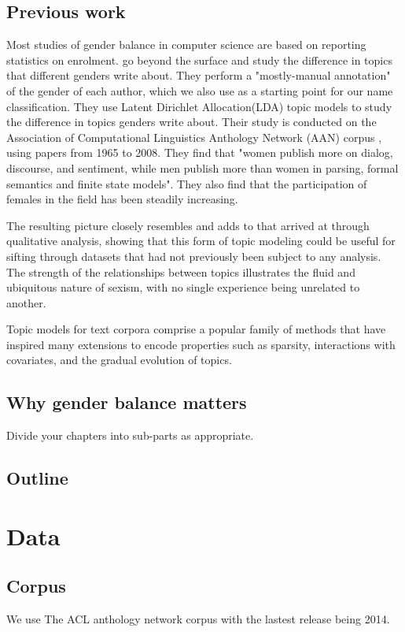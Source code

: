 \documentclass[bsc,frontabs,twoside,singlespacing,parskip,deptreport]{infthesis}     %
\begin{document}
\section{Previous work}

Most studies of gender balance in computer science are based on reporting statistics on enrolment. \cite{Jurafsky_Hesaid} go beyond the surface and study the difference in topics that different genders write about. They perform a "mostly-manual annotation" of the gender of each author, which we also use as a starting point for our name classification. They use Latent Dirichlet Allocation(LDA) topic models \citep{Blei_LDA} to study the difference in topics genders write about. Their study is conducted on the Association of Computational Linguistics Anthology Network (AAN) corpus \citep{aan}, using papers from 1965 to 2008. They find that "women publish more on dialog, discourse, and sentiment, while men publish more than women in parsing, formal semantics and finite state models". They also find that the participation of females in the field has been steadily increasing.

 The resulting picture closely resembles and adds to that arrived at through qualitative analysis, showing that this form of topic modeling could be useful for sifting through datasets that had not previously been subject to any analysis. The strength of the relationships between topics illustrates the fluid and ubiquitous nature of sexism, with no single experience being unrelated to another.

Topic models for text corpora comprise a popular family of methods that have inspired many extensions to encode properties such as sparsity, interactions with covariates, and the gradual evolution of topics.
\section{Why gender balance matters}

Divide your chapters into sub-parts as appropriate.

\section{Outline}

\chapter{Data}
\section{Corpus}
We use The ACL anthology network corpus \cite{aan} with the lastest release being 2014. 
\end{document}
